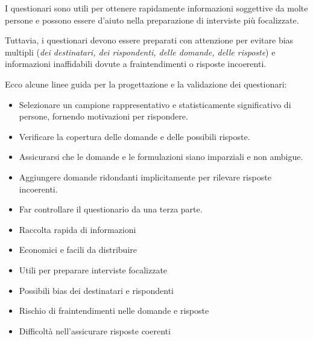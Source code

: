 I questionari sono utili per ottenere rapidamente informazioni soggettive da
molte persone e possono essere d'aiuto nella preparazione di interviste più
focalizzate.

Tuttavia, i questionari devono essere preparati con attenzione per evitare
bias multipli (\textit{dei destinatari, dei rispondenti, delle domande, delle risposte})
e informazioni inaffidabili dovute a fraintendimenti o risposte incoerenti.

Ecco alcune linee guida per la progettazione e la validazione dei questionari:

\begin{itemize}
    \item Selezionare un campione rappresentativo e statisticamente significativo
    di persone, fornendo motivazioni per rispondere.
    \item Verificare la copertura delle domande e delle possibili risposte.
    \item Assicurarsi che le domande e le formulazioni siano imparziali e non
    ambigue.
    \item Aggiungere domande ridondanti implicitamente per rilevare risposte
    incoerenti.
    \item Far controllare il questionario da una terza parte.
\end{itemize}

\begin{tcolorbox}[colback=green!5!white,colframe=green!75!black, title=Pro dei questionari]
    \begin{itemize}
        \item Raccolta rapida di informazioni
        \item Economici e facili da distribuire
        \item Utili per preparare interviste focalizzate
    \end{itemize}
\end{tcolorbox}

\begin{tcolorbox}[colback=red!5!white,colframe=red!75!black, title=Contro dei questionari]
    \begin{itemize}
        \item Possibili bias dei destinatari e rispondenti
        \item Rischio di fraintendimenti nelle domande e risposte
        \item Difficoltà nell'assicurare risposte coerenti
    \end{itemize}
\end{tcolorbox}

